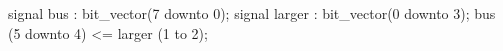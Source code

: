 signal bus : bit_vector(7 downto 0);
signal larger : bit_vector(0 downto 3);
bus (5 downto 4) <= larger (1 to 2);